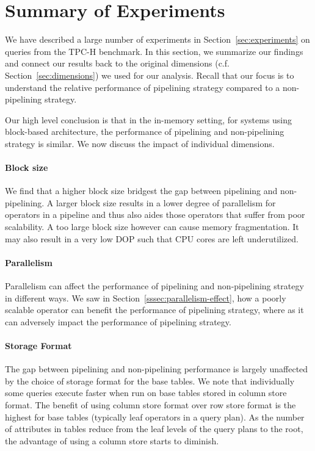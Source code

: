 \section{Summary of Experiments}\label{sec:experiment-summary}
We have described a large number of experiments in Section~\ref{sec:experiments} on queries from the TPC-H benchmark.
In this section, we summarize our findings and connect our results back to the original dimensions (c.f. Section~\ref{sec:dimensions}) we used for our analysis.
Recall that our focus is to understand the relative performance of pipelining strategy compared to a non-pipelining strategy.

Our high level conclusion is that in the in-memory setting, for systems using block-based architecture, the performance of pipelining and non-pipelining strategy is similar.
We now discuss the impact of individual dimensions.

\paragraph*{\textbf{Block size}}
We find that a higher block size bridgest the gap between pipelining and non-pipelining. 
A larger block size results in a lower degree of parallelism for operators in a pipeline and thus also aides those operators that suffer from poor scalability. 
A too large block size however can cause memory fragmentation.
It may also result in a very low DOP such that CPU cores are left underutilized. 

\paragraph*{\textbf{Parallelism}}
Parallelism can affect the performance of pipelining and non-pipelining strategy in different ways. 
We saw in Section~\ref{sssec:parallelism-effect}, how a poorly scalable operator can benefit the performance of pipelining strategy, where as it can adversely impact the performance of pipelining strategy.

\paragraph*{\textbf{Storage Format}}
The gap between pipelining and non-pipelining performance is largely unaffected by the choice of storage format for the base tables.
We note that individually some queries execute faster when run on base tables stored in column store format. 
The benefit of using column store format over row store format is the highest for base tables (typically leaf operators in a query plan).
As the number of attributes in tables reduce from the leaf levels of the query plans to the root, the advantage of using a column store starts to diminish. 

